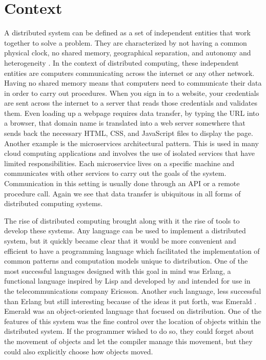 
\chapter{Context}
\label{cha:context}


A distributed system can be defined as a set of independent entities that work together to solve a problem. They are characterized by not having a common physical clock, no shared memory, geographical separation, and autonomy and heterogeneity \cite{alma991001697099707681}.
In the context of distributed computing, these independent entities are computers communicating across the internet or any other network. Having no shared memory means that computers need to communicate their data in order to carry out procedures. When you sign in to a website, your credentials are sent across the internet to a server that reads those credentials and validates them. Even loading up a webpage requires data transfer, by typing the URL into a browser, that domain name is translated into a web server somewhere that sends back the necessary HTML, CSS, and JavaScript files to display the page. Another example is the microservices architectural pattern. This is used in many cloud computing applications and involves the use of isolated services that have limited responsibilities. Each microservice lives on a specific machine and communicates with other services to carry out the goals of the system. Communication in this setting is usually done through an API or a remote procedure call. Again we see that data transfer is ubiquitous in all forms of distributed computing systems.

The rise of distributed computing brought along with it the rise of tools to develop these systems. Any language can be used to implement a distributed system, but it quickly became clear that it would be more convenient and efficient to have a programming language which facilitated the implementation of common patterns and computation models unique to distribution. One of the most successful languages designed with this goal in mind was Erlang, a functional language inspired by Lisp and developed by and intended for use in the telecommunications company Ericsson. Another such language, less successful than Erlang but still interesting because of the ideas it put forth, was Emerald \cite{BlackAndrew2007Tdot}. Emerald was an object-oriented language that focused on distribution. One of the features of this system was the fine control over the location of objects within the distributed system. If the programmer wished to do so, they could forget about the movement of objects and let the compiler manage this movement, but they could also explicitly choose how objects moved.

